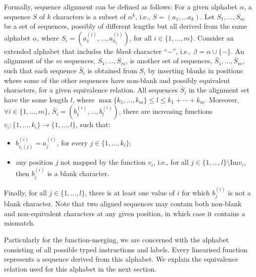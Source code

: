 Formally, sequence alignment can be defined as follows:
For a given alphabet $\alpha$, a sequence $S$ of $k$ characters is a subset of
$\alpha^k$, i.e., $S = (a_1, \ldots a_k)$.
Let $S_1, \ldots, S_m$ be a set of sequences, possibly of different lengths but
all derived from the same alphabet $\alpha$, where
$S_i = (a_1^{(i)}, \ldots, a_{k_1}^{(i)})$, for all $i\in\{1,\ldots,m\}$.
Consider an extended alphabet that includes the \textit{blank} character ``$-$'',
i.e., $\beta = \alpha \cup \{-\}$.
An alignment of the $m$ sequences, $S_1, \ldots, S_m$, is another set of sequences,
$\bar{S}_1, \ldots, \bar{S}_m$, such that each sequence $\bar{S}_i$ is obtained
from $S_i$ by inserting blanks in positions where some of the other sequences
have non-blank and possibly equivalent characters, for a given equivalence relation.
All sequences $\bar{S}_i$ in the alignment set have the same length $l$, where
$\max\{k_1,\ldots,k_m\} \leq l \leq k_1 + \cdots + k_m$.
Moreover, $\forall i\in\{1,\ldots, m\}$, $\bar{S}_i = (b_1^{(i)},\ldots,b_l^{(i)})$,
there are increasing functions $v_i: \{1,\ldots,k_i\} \to \{1,\ldots,l\}$, such that:
\begin{itemize} %
\item $b_{v_i(j)}^{(i)} = a_j^{(i)}$, for every $j \in \{1,\ldots,k_i\}$;
\item any position $j$ not mapped by the function $v_i$, i.e.,
for all $j \in \{1,\ldots,l\}\setminus \textrm{Im} v_i$,
then $b_j^{(i)}$ is a blank character.
\end{itemize}
Finally, for all $j\in\{1,\ldots,l\}$, there is at least one value of $i$ for
which $b_j^{(i)}$ is not a blank character.
Note that two aligned sequences may contain both non-blank and non-equivalent
characters at any given position, in which case it contains a mismatch.

Particularly for the function-merging, we are concerned with the alphabet
consisting of all possible typed instructions and labels.
Every linearised function represents a sequence derived from this alphabet.
We explain the equivalence relation used for this alphabet in the next section.

